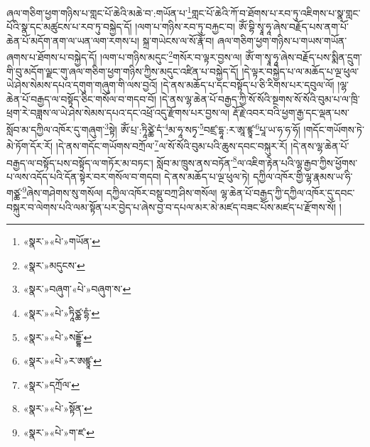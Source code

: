 ཞལ་གཅིག་ཕྱག་གཉིས་པ་གླང་པོ་ཆེའི་མཆེ་བ་:གཡོན་པ་\footnote{«སྣར་»«པེ་»གཡོན་}གླང་པོ་ཆེའི་ཀོ་བ་ཐོགས་པ་རབ་ཏུ་འཇིགས་པ་སྣ་གླང་པོའི་སྣ་དང་མཚུངས་པ་རབ་ཏུ་བསྐྱེད་དོ། །ལག་པ་གཉིས་རབ་ཏུ་བརྐྱང་བ། ཨོཾ་བྷི་སྭཱ་ཧཱ་ཞེས་བརྗོད་པས་ནག་པོ་ཆེན་པོ་མདོག་ནག་ལ་ཡན་ལག་རགས་པ། སྐྲ་གཡེངས་ལ་སོ་རྣོ་བ། ཞལ་གཅིག་ཕྱག་གཉིས་པ་གཡས་གཡོན་ཞགས་པ་ཐོགས་པ་བསྐྱེད་དོ། །ལག་པ་གཉིས་མདུང་\footnote{«སྣར་»མདུངས་}གསོར་བ་ལྟར་བྱས་ལ། ཨོཾ་ག་སྭཱ་ཧཱ་ཞེས་བརྗོད་པས་སྨིན་དྲུག་གི་བུ་མདོག་ལྗང་གུ་ཞལ་གཅིག་ཕྱག་གཉིས་ཀྱིས་མདུང་འཛིན་པ་བསྐྱེད་དོ། །དེ་ལྟར་བསྐྱེད་པ་ལ་མཆོད་པ་ལྔ་ཕུལ་ཡེ་ཤེས་སེམས་དཔའ་དགུག་གཞུག་གི་ལས་བྱའོ། །དེ་ནས་མཆོད་པ་དང་བསྟོད་པ་ཅི་རིགས་པར་དབུལ་ལོ། །ལྷ་ཆེན་པོ་བརྒྱད་ལ་བསྟོད་ཅིང་གསོལ་བ་གདབ་བོ། །དེ་ནས་ལྷ་ཆེན་པོ་བརྒྱད་ཀྱི་སོ་སོའི་སྔགས་སོ་སོའི་བུམ་པ་ལ་ཁྲི་ཕྲག་རེ་བཟླས་ལ་ཡེ་ཤེས་སེམས་དཔའ་དང་འཕྲོ་འདུ་རྫོགས་པར་བྱས་ལ། རྡོ་རྗེ་འབར་བའི་ཕྱག་རྒྱ་དང་ལྡན་པས་སློབ་མ་དཀྱིལ་འཁོར་དུ་གཞུག་\footnote{«སྣར་»བཞུག་«པེ་»བཞུག་ས་}སྟེ། ཨོཾ་པྲ་:ཏཱིཙྪེ་དཾ་\footnote{«སྣར་»«པེ་»ཏཱིཙྪ་དྷཾ་}མ་ཧཱ་སཏྭ་\footnote{«སྣར་»«པེ་»སདྡྷོ་}བཛྲ་དྷཱ་:ར་ཨཱ་ཛྙཱ་\footnote{«སྣར་»«པེ་»ར་ཨཛྙཱ་}པཱ་ཡ་ཧ་ཧ་ཧོ། །གདོང་གཡོགས་ཏེ་མེ་ཏོག་དོར་རོ། །དེ་ནས་གདོང་གཡོགས་བཀྲོལ་\footnote{«སྣར་»དཀྲོལ་}ལ་སོ་སོའི་བུམ་པའི་ཆུས་དབང་བསྐུར་རོ། །དེ་ནས་ལྷ་ཆེན་པོ་བརྒྱད་ལ་བསྟོད་པས་བསྟོད་ལ་གཏོར་མ་བཏང་། སློབ་མ་ཁྲུས་ནས་བཏོན་\footnote{«སྣར་»«པེ་»སྟོན་}ལ་འཇིག་རྟེན་པའི་ལྷ་རྒྱབ་ཀྱིས་ཕྱོགས་པ་ལས་འདོད་པའི་དོན་སྟེར་བར་གསོལ་བ་གདབ། དེ་ནས་མཆོད་པ་ལྔ་ཕུལ་ཏེ། དཀྱིལ་འཁོར་གྱི་ལྷ་རྣམས་ཡ་ཧི་གཙྪ་\footnote{«སྣར་»«པེ་»ག་ཛ་}ཞེས་གཤེགས་སུ་གསོལ། དཀྱིལ་འཁོར་བསྡུ་བཀྲ་ཤིས་གསོལ། ལྷ་ཆེན་པོ་བརྒྱད་ཀྱི་དཀྱིལ་འཁོར་དུ་དབང་བསྐུར་བ་ལེགས་པའི་ལམ་སྟོན་པར་བྱེད་པ་ཞེས་བྱ་བ་དཔལ་མར་མེ་མཛད་བཟང་པོས་མཛད་པ་རྫོགས་སོ། ། 